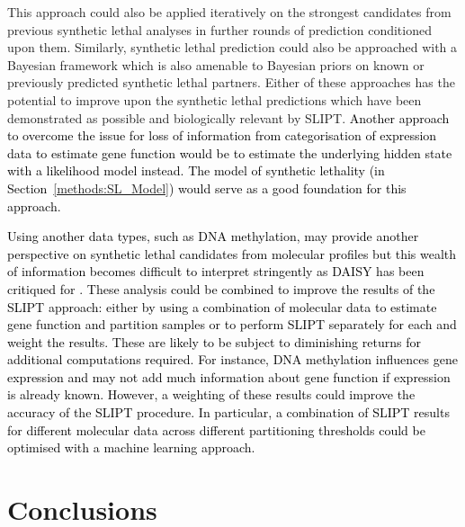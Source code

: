 This approach could also be applied iteratively on the strongest candidates from previous \gls{synthetic lethal} analyses in further rounds of prediction conditioned upon them. Similarly, \gls{synthetic lethal} prediction could also be approached with a Bayesian framework \citep{Friedman2000, Jansen2003, Imoto2004} which is also amenable to Bayesian priors on known or previously predicted \gls{synthetic lethal} partners. Either of these approaches has the potential to improve upon the \gls{synthetic lethal} predictions which have been demonstrated as possible and biologically relevant by \gls{SLIPT}. \textcolor{black}{Another approach to overcome the issue for loss of information from categorisation of expression data to estimate gene function would be \textcolor{black}{to} estimate the underlying hidden state with a likelihood model instead. The model of synthetic lethality (in Section~\ref{methods:SL_Model}) would serve as a good foundation for this approach.}

\textcolor{black}{
Using another data types, such as DNA methylation, may provide another perspective on synthetic lethal candidates from molecular profiles but this wealth of information becomes difficult to interpret stringently as \gls{DAISY} has been critiqued for \citep{Lu2015}. These analysis could be combined to improve the results of the SLIPT approach: either by using a combination of molecular data to estimate gene function and partition samples or to perform SLIPT separately for each and weight the results. These are likely to be subject to diminishing returns for additional computations required. For instance, DNA methylation influences gene expression and may not add much information about gene function if expression is already known. However, a weighting of these results could improve the accuracy of the SLIPT procedure. In particular, a combination of SLIPT results for different molecular data across different partitioning thresholds could be optimised with a machine learning approach.   
}
\section{Conclusions}
\label{chap:conclusion}

